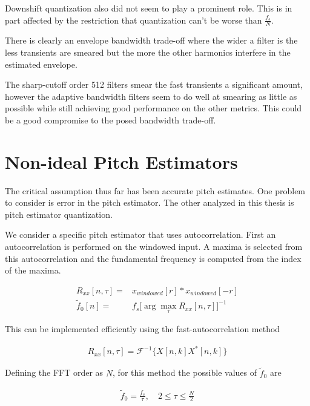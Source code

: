 \documentclass [11pt, proquest,oneside] {ganter_thesis}[2015/03/03]
\begin{document}
Downshift quantization also did not seem to play a prominent role.  This is in part affected by the restriction that quantization can't be worse than $\frac{f_s}{N}$.

There is clearly an envelope bandwidth trade-off where the wider a filter is the less transients are smeared but the more the other harmonics interfere in the estimated envelope.

The sharp-cutoff order 512 filters smear the fast transients a significant amount, however the adaptive bandwidth filters seem to do well at smearing as little as possible while still achieving good performance on the other metrics.  This could be a good compromise to the posed bandwidth trade-off.


\section{Non-ideal Pitch Estimators}\label{section:non-ideal_pitch}

The critical assumption thus far has been accurate pitch estimates.  One problem to consider is error in the pitch estimator.  The other analyzed in this thesis is pitch estimator quantization.

We consider a specific pitch estimator that uses autocorrelation.  First an autocorrelation is performed on the windowed input.  A maxima is selected from this autocorrelation and the fundamental frequency is computed from the index of the maxima.

\begin{align}
R_{xx}[n,\tau] =& x_{windowed}[r] * x_{windowed}[-r] \\
\tilde{f}_0[n] =& f_s \Bigg[ \arg\max_\tau R_{xx}[n,\tau] \Bigg]^{-1}
\end{align}

This can be implemented efficiently using the fast-autocorrelation method

\begin{align}
R_{xx}[n,\tau] = \mathcal{F}^{-1}\Big\{X[n,k]X^*[n,k]\Big\}
\end{align}

Defining the FFT order as $N$, for this method the possible values of $\tilde{f}_0$ are 

\begin{align}
\tilde{f}_0 = \frac{f_s}{\tau}, \quad 2 \leq \tau \leq \frac{N}{2}
\end{align}
\end{document}
